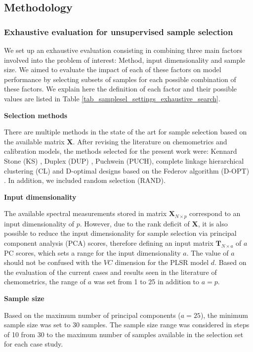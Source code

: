 \documentclass[journal=ancham,manuscript=article]{achemso}
\begin{document}
\subsection*{Methodology}\label{methodology}

\subsubsection*{Exhaustive evaluation for unsupervised sample selection}

We set up an exhaustive evaluation consisting in combining three main factors involved into the problem of interest: Method, input dimensionality and sample size. We aimed to evaluate the impact of each of these factors on model performance by selecting subsets of samples for each possible combination of these factors. We explain here the definition of each factor and their possible values are listed in Table \ref{tab_samplesel_settings_exhaustive_search}.

\textbf{Selection methods}

There are multiple methods in the state of the art for sample selection based on the available matrix $\mathbf{X}$. After revising the literature on chemometrics and calibration models, the methods selected for the present work were: Kennard Stone (KS) \cite{Kennard1969}, Duplex (DUP) \cite{Snee1977}, Puchwein (PUCH)\cite{Puchwein1988}, complete linkage hierarchical clustering (CL) \cite{Naes1990} and D-optimal designs based on the Federov algorithm (D-OPT) \cite{Goos2011}. In addition, we included random selection (RAND). 

\textbf{Input dimensionality}

The available spectral measurements stored in matrix $\mathbf{X}_{N\times p}$ correspond to an input dimensionality of $p$. However, due to the rank deficit of $\mathbf{X}$, it is also possible to reduce the input dimensionality for sample selection via principal component analysis (PCA) scores, therefore defining an input matrix $\mathbf{T}_{N\times a}$ of $a$ PC scores, which sets a range for the input dimensionality $a$. The value of $a$ should not be confused with the $VC$ dimension for the PLSR model $d$. Based on the evaluation of the current cases and results seen in the literature of chemometrics, the range of $a$ was set from 1 to 25 in addition to $a=p$. 

\textbf{Sample size}

Based on the maximum number of principal components ($a=25$), the minimum sample size was set to 30 samples. The sample size range was considered in steps of 10 from 30 to the maximum number of samples available in the selection set for each case study. 
\end{document}
